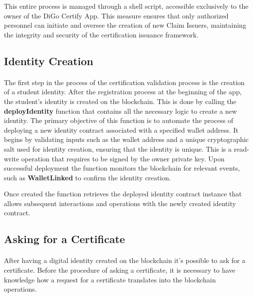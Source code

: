 This entire process is managed through a shell script, accessible exclusively to the owner of the DiGo Certify App. This measure ensures that only authorized personnel can initiate and oversee the creation of new Claim Issuers, maintaining the integrity and security of the certification issuance framework.

\subsection{Identity Creation}\label{subsec:creating-identities}
\paragraph{}

The first step in the process of the certification validation process is the creation of a student identity. After the registration process at the beginning of the app, the student's identity is created on the blockchain.
This is done by calling the \textbf{deployIdentity} function that contains all the necessary logic to create a new identity. The primary objective of this function is to automate the process of deploying a new identity contract associated with a specified wallet address.
It begins by validating inputs such as the wallet address and a unique cryptographic salt used for identity creation, ensuring that the identity is unique. This is a read-write operation
that requires to be signed by the owner private key. Upon successful deployment the function monitors the blockchain for relevant events, such as \textbf{WalletLinked} to confirm the identity creation.

Once created the function retrieves the deployed identity contract instance that allows subsequent interactions and operations with the newly created identity contract.

\subsection{Asking for a Certificate}\label{subsec:asking-for-a-certificate}
\paragraph{}

After having a digital identity created on the blockchain it's possible to ask for a certificate. Before the procedure of asking a certificate, it is necessary to have knowledge how a request for a certificate translates into the blockchain operations.

